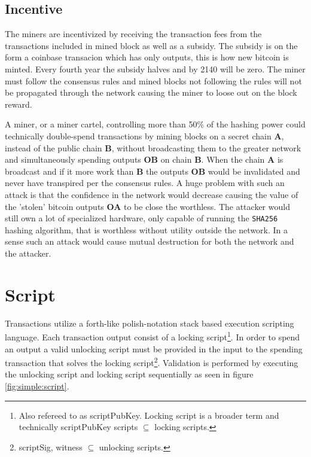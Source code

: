 \subsection{Incentive}

The miners are incentivized by receiving the transaction fees from the transactions included in mined block as well as a subsidy. The subsidy is on the form a coinbase transacion which has only outputs, this is how new bitcoin is minted. Every fourth year the subsidy halves and by 2140 will be zero. The miner must follow the consensus rules and mined blocks not following the rules will not be propagated through the network causing the miner to loose out on the block reward.

A miner, or a miner cartel, controlling more than 50\% of the hashing power could technically double-spend transactions by mining blocks on a secret chain \textbf{A}, instead of the public chain \textbf{B}, without broadcasting them to the greater network and simultaneously spending outputs \textbf{OB} on chain \textbf{B}. When the chain \textbf{A} is broadcast and if it more work than \textbf{B} the outputs \textbf{OB} would be invalidated and never have transpired per the consensus rules. A huge problem with such an attack is that the confidence in the network would decrease causing the value of the 'stolen' bitcoin outputs \textbf{OA} to be close the worthless. The attacker would still own a lot of specialized hardware, only capable of running the \texttt{SHA256} hashing algorithm, that is worthless without utility outside the network. In a sense such an attack would cause mutual destruction for both the network and the attacker. 

\section{Script}
\label{sec:script}

Transactions utilize a forth-like polish-notation stack based execution scripting language\cite{antonopoulos:mastering:bitcoin}. Each transaction output consist of a locking script\footnote{Also refereed to as scriptPubKey. Locking script is a broader term and technically scriptPubKey scripts $ \subseteq $ locking scripts.}. In order to spend an output a valid unlocking script must be provided in the input to the spending transaction that solves the locking script\footnote{scriptSig, witness $\subseteq $ unlocking scripts.}. Validation is performed by executing the unlocking script and locking script sequentially as seen in figure \ref{fig:simple:script}. 

